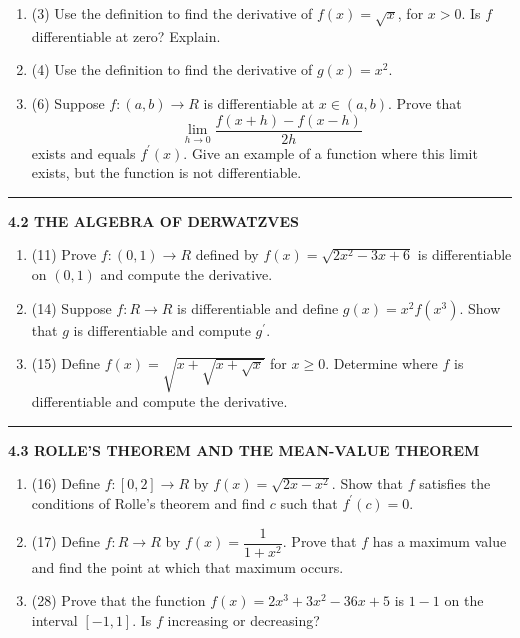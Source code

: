 \documentclass[fleqn]{article}
\begin{document}
\begin{enumerate}
    \item (3) Use the definition to find the derivative of $f(x)=\sqrt{x}$, for $x > 0$. Is $f$ differentiable at zero? Explain.

    \item (4) Use the definition to find the derivative of $g(x)=x^2$.

    \item (6) Suppose $f: (a, b) \longrightarrow R$ is differentiable at $x \in (a, b)$. Prove that 
    $$
      \lim\limits_{h \to 0} \dfrac{f(x+h)-f(x-h)}{2h}
    $$
    exists and equals $f^'(x)$. Give an example of a function where this limit exists, but the
    function is not differentiable.


  \end{enumerate}

  \rule{15cm}{1pt}

  \textbf{4.2  THE ALGEBRA OF DERWATZVES}
  \begin{enumerate}
    \item (11) Prove $f: (0, 1) \longrightarrow R$ defined by $f(x)=\sqrt{2x^2-3x+6}$ is differentiable on $(0, 1)$ and 
    compute the derivative.

    \item (14) Suppose $f: R \longrightarrow R$ is differentiable and define $g(x)=x^2 f(x^3)$. Show that $g$ is
    differentiable and compute $g^'$.
    
    \item (15) Define $f(x)=\sqrt{x+\sqrt{x+\sqrt{x}}}$ for $x \geq 0$. Determine where $f$ is differentiable and compute
    the derivative. 
  \end{enumerate}

  \rule{15cm}{1pt}

  \textbf{4.3 ROLLE'S THEOREM AND THE MEAN-VALUE THEOREM}
  \begin{enumerate}
    \item (16) Define $f: [0, 2] \longrightarrow R$ by $f(x)=\sqrt{2x-x^2}$. Show that $f$ satisfies the conditions of Rolle's
    theorem and find $c$ such that $f^'(c)=0$.

    \item (17) Define $f: R \longrightarrow R$ by $f(x)=\dfrac{1}{1+x^2}$. Prove that $f$ has a maximum value and find the
    point at which that maximum occurs.  

    \item (28) Prove that the function $f(x)=2x^3+3x^2-36x+5$ is $1-1$ on the interval $[-1,1]$. Is $f$ increasing or decreasing?
  \end{enumerate}
\end{document}
